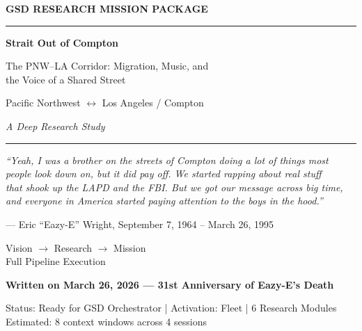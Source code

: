 \documentclass[11pt,letterpaper]{article}
\begin{document}

\thispagestyle{empty}
\begin{center}
\vspace*{2.5cm}

{\small\sffamily\textcolor{primary}{\textbf{GSD RESEARCH MISSION PACKAGE}}}

\vspace{0.3cm}
\textcolor{bordergray}{\rule{8cm}{0.4pt}}

\vspace{1.5cm}
{\fontsize{30}{38}\selectfont\bfseries\sffamily\textcolor{primary}{Strait Out of Compton}}

\vspace{0.5cm}
{\fontsize{14}{18}\selectfont\sffamily\textcolor{secondary}{The PNW--LA Corridor: Migration, Music, and\\[0.2em]the Voice of a Shared Street}}

\vspace{0.6cm}
{\large\sffamily\textcolor{tertiary}{Pacific Northwest $\longleftrightarrow$ Los Angeles / Compton}}

\vspace{0.4cm}
{\large\sffamily\itshape\textcolor{accent}{A Deep Research Study}}

\vspace{0.4cm}
\textcolor{bordergray}{\rule{6cm}{0.4pt}}

\vspace{0.5cm}
\begin{quotebox}
\centering
{\small\sffamily\itshape\textcolor{primary}{``Yeah, I was a brother on the streets of Compton doing a lot of things most\\[0.2em]
people look down on, but it did pay off. We started rapping about real stuff\\[0.2em]
that shook up the LAPD and the FBI. But we got our message across big time,\\[0.2em]
and everyone in America started paying attention to the boys in the hood.''}}

\vspace{0.3cm}
{\small\sffamily\textcolor{secondary}{--- Eric ``Eazy-E'' Wright, September 7, 1964 -- March 26, 1995}}
\end{quotebox}

\vspace{1cm}
{\sffamily\textcolor{accent}{Vision $\rightarrow$ Research $\rightarrow$ Mission}}\\[0.3em]
{\small\sffamily\textcolor{accent}{Full Pipeline Execution}}

\vspace{1.5cm}
{\small\sffamily\textcolor{primary}{\textbf{Written on March 26, 2026 --- 31st Anniversary of Eazy-E's Death}}}

\vspace{0.5cm}
{\small\sffamily\textcolor{subtlegray}{Status: Ready for GSD Orchestrator | Activation: Fleet | 6 Research Modules}}\\[0.3em]
{\small\sffamily\textcolor{subtlegray}{Estimated: 8 context windows across 4 sessions}}
\end{center}
\newpage
\end{document}
